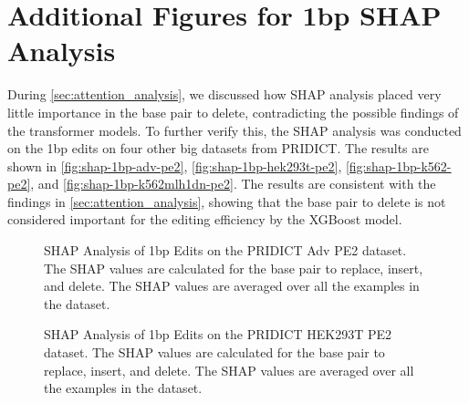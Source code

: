 \newpage

\section{Additional Figures for 1bp SHAP Analysis}
\label{appendix:shap-1bp-pridict}

During \autoref{sec:attention_analysis}, we discussed how SHAP analysis placed very little importance in the base pair to delete, contradicting the possible findings of the transformer models. To further verify this, the SHAP analysis was conducted on the 1bp edits on four other big datasets from PRIDICT. The results are shown in \autoref{fig:shap-1bp-adv-pe2}, \autoref{fig:shap-1bp-hek293t-pe2}, \autoref{fig:shap-1bp-k562-pe2}, and \autoref{fig:shap-1bp-k562mlh1dn-pe2}. The results are consistent with the findings in \autoref{sec:attention_analysis}, showing that the base pair to delete is not considered important for the editing efficiency by the XGBoost model.

\begin{figure}[!htb]
    \centering
    \caption[SHAP Analysis of 1bp Edits on PRIDICT Adv PE2 Dataset]{SHAP Analysis of 1bp Edits on the PRIDICT Adv PE2 dataset. The SHAP values are calculated for the base pair to replace, insert, and delete. The SHAP values are averaged over all the examples in the dataset.}
    \label{fig:shap-1bp-adv-pe2}
\end{figure}

\begin{figure}[!htb]
    \centering
    \caption[SHAP Analysis of 1bp Edits on PRIDICT HEK293T PE2 Dataset]{SHAP Analysis of 1bp Edits on the PRIDICT HEK293T PE2 dataset. The SHAP values are calculated for the base pair to replace, insert, and delete. The SHAP values are averaged over all the examples in the dataset.}
    \label{fig:shap-1bp-hek293t-pe2}
\end{figure}

